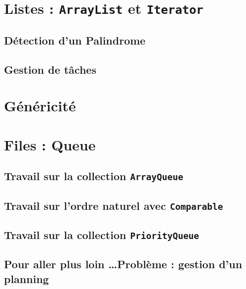 \documentclass[12pt,a4paper,openany]{book}
\begin{document}
	\thispagestyle{empty} %
	\titleBC 
	\setcounter{tocdepth}{2}
	\setcounter{secnumdepth}{3}
	\tableofcontents
	\chapter{Listes : \texttt{ArrayList} et \texttt{Iterator}}
	\section{Détection d'un Palindrome}
		
	\section{Gestion de tâches}
		
		

	\chapter{Généricité}
		
	\chapter{Files : Queue}
	\section{Travail sur la collection \texttt{ArrayQueue}}
		
	\section{Travail sur l'ordre naturel avec \texttt{Comparable}}
		
		
	\section{Travail sur la collection \texttt{PriorityQueue}}
		
	\section{Pour aller plus loin \ldots Problème : gestion d'un planning}
		
		
	
\end{document}
